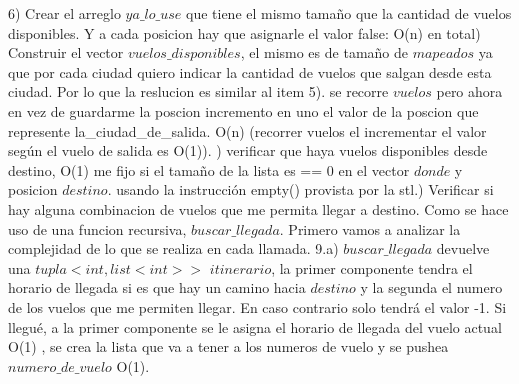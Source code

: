 \documentclass[a4paper]{article}
\begin{document}
6) Crear el arreglo $ya\_lo\_use$ que tiene el mismo tamaño que la cantidad de vuelos disponibles. Y a cada posicion hay que asignarle el valor false: O(n) en total) Construir el vector $vuelos\_disponibles$, el mismo es de tamaño de $mapeados$ ya que por cada  ciudad quiero indicar la cantidad de vuelos que salgan desde esta ciudad. Por lo que la reslucion es similar al item 5). se recorre $vuelos$ pero ahora en vez de guardarme la poscion incremento en uno el valor de la poscion que represente la\_ciudad\_de\_salida. O(n) (recorrer vuelos el incrementar el valor según el vuelo de salida es O(1)).  ) verificar que haya vuelos disponibles desde destino, O(1) me fijo si el tamaño de la lista es == 0 en el vector $donde$ y posicion $destino$. usando la instrucción empty() provista por la stl.) Verificar si hay alguna combinacion de vuelos que me permita llegar a destino. Como se hace uso de una funcion recursiva, $buscar\_llegada$. Primero vamos a analizar la complejidad de lo que se realiza en cada llamada.\newline
9.a) $buscar\_llegada$ devuelve una $tupla<int, list<int>>$ $itinerario$, la primer componente tendra el horario de llegada si es que hay un camino hacia $destino$ y la segunda el numero de los vuelos que me permiten llegar. En caso contrario solo tendrá el valor -1.  Si llegué, a la primer componente se le asigna el horario de llegada del vuelo actual O(1) , se crea la lista que va a tener a los numeros de vuelo y se pushea $numero\_de\_vuelo$ O(1).\newline
\end{document}
